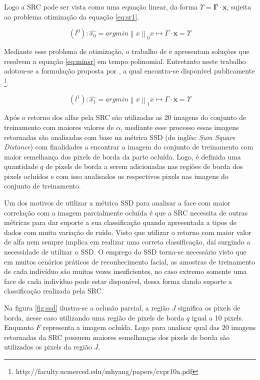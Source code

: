 Logo a SRC pode ser vista como uma equação linear, da forma $\Upsilon = \mathbf{\Gamma} \cdot \mathbf{x}$, sujeita ao problema otimização da equação \ref{eq:sr1}.

\begin{equation}
\label{eq:sr1}
(l^0): \hat{x_0} = argmin\left \| x \right \|_0  x \mapsto  \Gamma \cdot \mathbf{x} = \Upsilon
\end{equation}

Mediante esse problema de otimização, o trabalho de  e  apresentam soluções que resolvem a equação \ref{eq:minsr} em tempo polinomial. Entretanto neste trabalho adotou-se a formulação proposta por , a qual encontra-se disponível publicamente \footnote{http://faculty.ucmerced.edu/mhyang/papers/cvpr10a.pdf}.

\begin{equation}
\label{eq:minsr}
(l^1): \hat{x_1} = argmin\left \| x \right \|_1  x \mapsto  \Gamma \cdot \mathbf{x} = \Upsilon
\end{equation}



Após o retorno dos alfas pela SRC são utilizadas as 20 imagens do conjunto de treinamento com maiores valores de $\alpha$, mediante esse processo essas imagens retornadas são analisadas com base na métrica SSD (do inglês: \textit{Sum Square Distance}) com finalidades a encontrar a imagem do conjunto de treinamento com maior semelhança dos pixels de borda da parte ocluída. Logo, é definida uma quantidade $q$ de pixels de borda a serem adicionadas nas regiões de borda dos pixels ocluídos e com isso analisados os respectivos pixels nas imagens do conjunto de treinamento.

Um dos motivos de utilizar a métrica SSD para analisar a face com maior correlação com a imagem parcialmente ocluída é que a SRC necessita de outras métricas para dar suporte a sua classificação quando apresentada a tipos de dados com muita variação de ruído. Visto que utilizar o retorno com maior valor de alfa nem sempre implica em realizar uma correta classificação, daí surgindo a necessidade de utilizar o SSD.  O emprego do SSD torna-se necessário visto que em muitos cenários práticos de reconhecimento facial, as amostras de treinamento de cada indivíduo são muitas vezes insuficientes, no caso extremo somente uma face de cada indivíduo pode estar disponível, dessa forma dando suporte a classificação realizada pela SRC.


Na figura \ref{fig:ssd} ilustra-se a oclusão parcial, a região $J$ significa os pixels de borda, nesse caso utilizando uma região de pixels de borda $q$ igual a 10 pixels. Enquanto $F$ representa a imagem ocluída. Logo para analisar qual das 20 imagens retornadas da SRC possuem maiores semelhanças dos pixels de borda são utilizados os pixels da região $J$.

